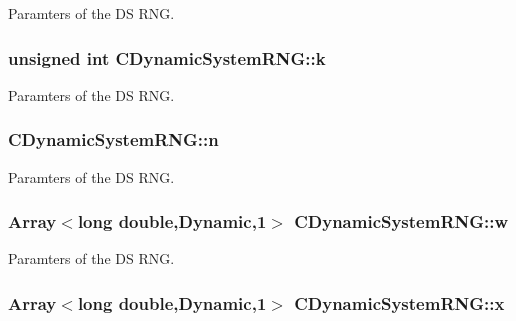 Paramters of the D\-S R\-N\-G. 

\hypertarget{class_c_dynamic_system_r_n_g_ae8946db15d06d35b9080109bab84001c}{
\subsubsection[{k}]{\setlength{\rightskip}{0pt plus 5cm}unsigned int C\-Dynamic\-System\-R\-N\-G\-::k\hspace{0.3cm}{\ttfamily [private]}}}\label{class_c_dynamic_system_r_n_g_ae8946db15d06d35b9080109bab84001c}


Paramters of the D\-S R\-N\-G. 

\hypertarget{class_c_dynamic_system_r_n_g_a8cdc452f933711c4146f9b6f8e9b53f2}{
\subsubsection[{n}]{ C\-Dynamic\-System\-R\-N\-G\-::n\hspace{0.3cm}{\ttfamily [private]}}}\label{class_c_dynamic_system_r_n_g_a8cdc452f933711c4146f9b6f8e9b53f2}


Paramters of the D\-S R\-N\-G. 

\hypertarget{class_c_dynamic_system_r_n_g_ad6d910566305fbb490cf785da19976e4}{
\subsubsection[{w}]{\setlength{\rightskip}{0pt plus 5cm}Array$<$long double,Dynamic,1$>$ C\-Dynamic\-System\-R\-N\-G\-::w\hspace{0.3cm}{\ttfamily [private]}}}\label{class_c_dynamic_system_r_n_g_ad6d910566305fbb490cf785da19976e4}


Paramters of the D\-S R\-N\-G. 

\hypertarget{class_c_dynamic_system_r_n_g_a41e389e017d88e1955ad45d237533560}{
\subsubsection[{x}]{\setlength{\rightskip}{0pt plus 5cm}Array$<$long double,Dynamic,1$>$ C\-Dynamic\-System\-R\-N\-G\-::x\hspace{0.3cm}{\ttfamily [private]}}}\label{class_c_dynamic_system_r_n_g_a41e389e017d88e1955ad45d237533560}



